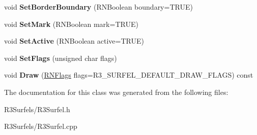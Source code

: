 \begin{DoxyCompactItemize}
\item 
void {\bfseries Set\+Border\+Boundary} (R\+N\+Boolean boundary=T\+R\+UE)\hypertarget{class_r3_surfel_ab7e804a79d200977837bca67888ab65c}{}\label{class_r3_surfel_ab7e804a79d200977837bca67888ab65c}

\item 
void {\bfseries Set\+Mark} (R\+N\+Boolean mark=T\+R\+UE)\hypertarget{class_r3_surfel_aebef5adb1685c967b33a005a79f26411}{}\label{class_r3_surfel_aebef5adb1685c967b33a005a79f26411}

\item 
void {\bfseries Set\+Active} (R\+N\+Boolean active=T\+R\+UE)\hypertarget{class_r3_surfel_a27c7598605cbef7e978d15b2c8c59711}{}\label{class_r3_surfel_a27c7598605cbef7e978d15b2c8c59711}

\item 
void {\bfseries Set\+Flags} (unsigned char flags)\hypertarget{class_r3_surfel_a19bd398afff05e305c58a88b92b00266}{}\label{class_r3_surfel_a19bd398afff05e305c58a88b92b00266}

\item 
void {\bfseries Draw} (\hyperlink{class_r_n_flags}{R\+N\+Flags} flags=R3\+\_\+\+S\+U\+R\+F\+E\+L\+\_\+\+D\+E\+F\+A\+U\+L\+T\+\_\+\+D\+R\+A\+W\+\_\+\+F\+L\+A\+GS) const \hypertarget{class_r3_surfel_a12e69af8376704ec61623cbc90283876}{}\label{class_r3_surfel_a12e69af8376704ec61623cbc90283876}

\end{DoxyCompactItemize}


The documentation for this class was generated from the following files\+:\begin{DoxyCompactItemize}
\item 
R3\+Surfels/R3\+Surfel.\+h\item 
R3\+Surfels/R3\+Surfel.\+cpp\end{DoxyCompactItemize}
